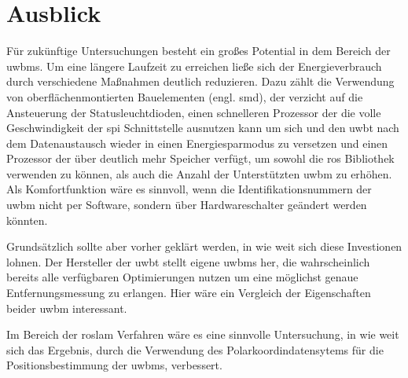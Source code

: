 %
%
\section{Ausblick}

Für zukünftige Untersuchungen besteht ein großes Potential in dem Bereich der \glspl{uwbm}. Um eine längere Laufzeit zu erreichen ließe sich der Energieverbrauch durch verschiedene Maßnahmen deutlich reduzieren. Dazu zählt die Verwendung von oberflächenmontierten Bauelementen (engl. \gls{smd}), der verzicht auf die Ansteuerung der Statusleuchtdioden, einen schnelleren Prozessor der die volle Geschwindigkeit der \gls{spi} Schnittstelle ausnutzen kann um sich und den \gls{uwbt} nach dem Datenaustausch wieder in einen Energiesparmodus zu versetzen und einen Prozessor der über deutlich mehr Speicher verfügt, um sowohl die \gls{ros} Bibliothek verwenden zu können, als auch die Anzahl der Unterstützten \gls{uwbm} zu erhöhen. Als Komfortfunktion wäre es sinnvoll, wenn die Identifikationsnummern der \gls{uwbm} nicht per Software, sondern über Hardwareschalter geändert werden könnten.

Grundsätzlich sollte aber vorher geklärt werden, in wie weit sich diese Investionen lohnen. Der Hersteller der \gls{uwbt} stellt eigene \glspl{uwbm} her, die wahrscheinlich bereits alle verfügbaren Optimierungen nutzen um eine möglichst genaue Entfernungsmessung zu erlangen. Hier wäre ein Vergleich der Eigenschaften beider \gls{uwbm} interessant.

Im Bereich der \gls{roslam} Verfahren wäre es eine sinnvolle Untersuchung, in wie weit sich das Ergebnis, durch die Verwendung des Polarkoordindatensytems für die Positionsbestimmung der \glspl{uwbm}, verbessert.


